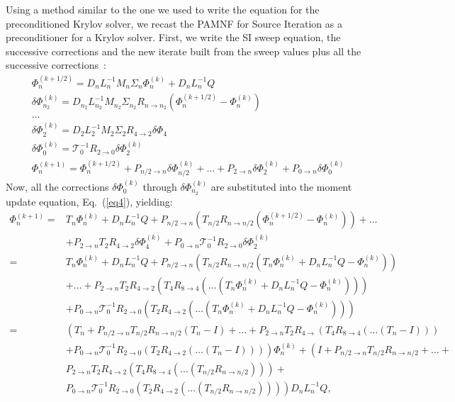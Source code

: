 \documentclass[preprint,10pt]{elsarticle}
\renewcommand{\(}{\left(}
\renewcommand{\)}{\right)}
\renewcommand{\[}{\left[}
\renewcommand{\]}{\right]}
\newcommand{\eqt}[1]{Eq.~(\ref{#1})}                     %
\begin{document}
Using a method similar to the one we used to write the equation for the 
preconditioned Krylov solver, we recast the PAMNF for Source Iteration as a
preconditioner for a Krylov solver. First, we write the SI sweep equation, the
successive corrections and the new iterate built from the sweep values plus all
the successive \hbox{corrections :}
\begin{align}
& \Phi_n^{(k+1/2)} = D_n L_n^{-1} M_n \Sigma_n \Phi_n^{(k)} + D_n L_n^{-1} Q
\label{eq1}\\
& \delta \Phi_{n_2}^{(k)} = D_{n_2} L_{n_2}^{-1} M_{n_2} \Sigma_{n_2}
R_{n\rightarrow n_2} \(\Phi_n^{(k+1/2)}-\Phi_n^{(k)}\) \label{eq2}\\
& \hdots\\
& \delta \Phi_2^{(k)} = D_2 L_2^{-1} M_2 \Sigma_2 R_{4\rightarrow 2} \delta \Phi_4\\
& \delta \Phi_0^{(k)} = \mathcal{T}_0^{-1} R_{2\rightarrow 0} \delta
\Phi_2^{(k)} \label{eq3}\\
& \Phi_n^{(k+1)} = \Phi_n^{(k+1/2)} + P_{n/2 \rightarrow n} \delta
\Phi_{n/2}^{(k)} + \hdots + P_{2 \rightarrow n} \delta \Phi_{2}^{(k)} + P_{0
\rightarrow n} \delta \Phi_{0}^{(k)}\label{eq4}
\end{align}
%
Now, all the corrections $\delta \Phi_0^{(k)}$ through $\delta \Phi_{n_2}^{(k)}$
are substituted into the moment update equation, \eqt{eq4}, yielding:
\begin{equation}
\begin{split}
\Phi_n^{(k+1)} =& T_n \Phi_n^{(k)} + D_n L_n^{-1} Q +
P_{n/2 \rightarrow n} \(T_{n/2}
R_{n\rightarrow n/2} \(\Phi_n^{(k+1/2)} - \Phi_n^{(k)}\)\)+\hdots \\
&+ P_{2 \rightarrow n} T_2 R_{4\rightarrow 2} \delta
\Phi_{4}^{(k)} + P_{0\rightarrow n} \mathcal{T}_0^{-1} R_{2\rightarrow 0} \delta 
\Phi_2^{(k)}\\
=& T_n \Phi_n^{(k)} + D_n L_n^{-1} Q + P_{n/2 \rightarrow
n} \(T_{n/2} R_{n \rightarrow n/2}\(T_n \Phi_n^{(k)} +D_n L_n^{-1} Q -\Phi_n^{(k)}
\)\)\\
& +\hdots + P_{2\rightarrow n} T_2 R_{4\rightarrow 2} 
\(T_4 R_{8\rightarrow 4}\( \hdots \(T_n \Phi_n^{(k)} + D_n L_n^{-1} Q -
 \Phi_n^{(k)}\)\) \) \\ 
&+ P_{0\rightarrow n} \mathcal{T}_0^{-1} R_{2\rightarrow 0}\(T_2 R_{4\rightarrow 2} 
\(\hdots\(T_n \Phi_n^{(k)}+D_n L_n^{-1}Q-\Phi_n^{(k)}\)\)\)\\
=& \(T_n + P_{n/2\rightarrow n} T_{n/2} R_{n\rightarrow n/2}\(T_n-I\)+
 \hdots + P_{2\rightarrow n} T_2 R_{4\rightarrow}
\(T_4 R_{8\rightarrow 4} \(\hdots\(T_n -I\)\)\)\right.\\ 
&\left. +P_{0\rightarrow n} \mathcal{T}_0^{-1} R_{2\rightarrow 0}  \(T_2
R_{4\rightarrow 2} (\hdots \(T_n-I\))\)\) \Phi_n^{(k)}
+\(I+P_{n/2\rightarrow n} T_{n/2} R_{n\rightarrow
n/2}+ \hdots + \right.\\
&\left. P_{2\rightarrow n} T_2 R_{4\rightarrow 2} \(T_4
 R_{8\rightarrow 4}\(\hdots
\(T_{n/2}R_{n\rightarrow n/2}\)\)\)+\right.\\
& \left. P_{0\rightarrow n} \mathcal{T}_0^{-1}R_{2\rightarrow 0}
\(T_2 R_{4\rightarrow 2}\(\hdots\(T_{n/2}R_{n\rightarrow n/2}\)\)\)\)
D_nL_n^{-1} Q ,
\end{split}
\end{equation}
\end{document}
